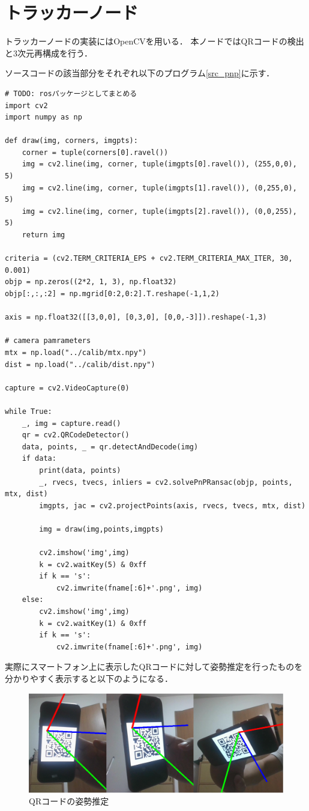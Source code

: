 \section{トラッカーノード}
\label{implement_tracker}
トラッカーノードの実装にはOpenCVを用いる．
本ノードではQRコードの検出と3次元再構成を行う．

ソースコードの該当部分をそれぞれ以下のプログラム\ref{src_pnp}に示す．

\begin{lstlisting}[caption=pnp\_qr.py,label=src_pnp]
# TODO: rosパッケージとしてまとめる
import cv2
import numpy as np

def draw(img, corners, imgpts):
    corner = tuple(corners[0].ravel())
    img = cv2.line(img, corner, tuple(imgpts[0].ravel()), (255,0,0), 5)
    img = cv2.line(img, corner, tuple(imgpts[1].ravel()), (0,255,0), 5)
    img = cv2.line(img, corner, tuple(imgpts[2].ravel()), (0,0,255), 5)
    return img

criteria = (cv2.TERM_CRITERIA_EPS + cv2.TERM_CRITERIA_MAX_ITER, 30, 0.001)
objp = np.zeros((2*2, 1, 3), np.float32)
objp[:,:,:2] = np.mgrid[0:2,0:2].T.reshape(-1,1,2)

axis = np.float32([[3,0,0], [0,3,0], [0,0,-3]]).reshape(-1,3)

# camera pamrameters
mtx = np.load("../calib/mtx.npy")
dist = np.load("../calib/dist.npy")

capture = cv2.VideoCapture(0)

while True:
    _, img = capture.read()
    qr = cv2.QRCodeDetector()
    data, points, _ = qr.detectAndDecode(img)
    if data:
        print(data, points)
        _, rvecs, tvecs, inliers = cv2.solvePnPRansac(objp, points, mtx, dist)
        imgpts, jac = cv2.projectPoints(axis, rvecs, tvecs, mtx, dist)

        img = draw(img,points,imgpts)

        cv2.imshow('img',img)
        k = cv2.waitKey(5) & 0xff
        if k == 's':
            cv2.imwrite(fname[:6]+'.png', img)
    else:
        cv2.imshow('img',img)
        k = cv2.waitKey(1) & 0xff
        if k == 's':
            cv2.imwrite(fname[:6]+'.png', img)
\end{lstlisting}

実際にスマートフォン上に表示したQRコードに対して姿勢推定を行ったものを分かりやすく表示すると以下のようになる．

\begin{figure}[htbp]
  \begin{center}
    \includegraphics[clip,width=15.0cm]{img/pnp_qr.png}
    \caption{QRコードの姿勢推定}
    \label{fig:pnp_qr_img}
  \end{center}
\end{figure}
